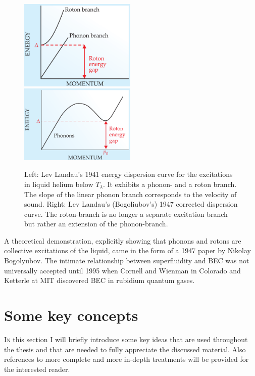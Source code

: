 \documentclass[12pt,a4paper,twosides]{book}
\begin{document}
		\begin{figure}[t]
			\begin{center}
				\includegraphics[width=0.495\textwidth]{phonon-roton-landau-first}
				\includegraphics[width=0.495\textwidth]{phonon-roton-bogoliubov}
			\end{center}
			\caption{Left: Lev Landau's 1941 energy dispersion curve for the excitations in liquid helium below $T_\lambda$. It exhibits a phonon- and a roton branch. The slope of the linear phonon branch corresponds to the velocity of sound. Right: Lev Landau's (Bogoliubov's) 1947 corrected dispersion curve. The roton-branch is no longer a separate excitation branch but rather an extension of the phonon-branch.}
			\label{fig:phonon-roton}
		\end{figure}

		A theoretical demonstration, explicitly showing that phonons and rotons are collective excitations of the liquid, came in the form of a 1947 paper by Nikolay Bogolyubov\citep{Bogolyubov1947}. The intimate relationship between superfluidity and BEC was not universally accepted until 1995 when Cornell and Wienman in Colorado and Ketterle at MIT discovered BEC in rubidium quantum gases\citep{Cornell2002,Ketterle2002}.

	\section{Some key concepts}
		\lettrine[lines=3,findent=3pt,nindent=0pt]{I}{n} this section I will briefly introduce some key ideas that are used throughout the thesis and that are needed to fully appreciate the discussed material. Also references to more complete and more in-depth treatments will be provided for the interested reader.
		
\end{document}
